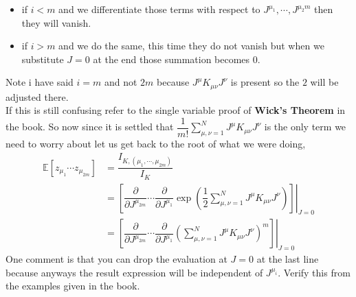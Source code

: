 \documentclass{scrartcl} %
\numberwithin{equation}{subsection}  %
\begin{document}
\begin{itemize}
	\item if $i < m$ and we differentiate those terms with respect to $J^{\mu_1},\cdots, J^{\mu_2m}$
		then they will vanish.
	\item if $i >m$ and we do the same, this time they do not vanish but when we substitute $J = 0$ at the end 
		those summation becomes $0$.
\end{itemize}
Note i have said $i = m$ and not $2m$ because $J^{\mu}K_{\mu \nu} J^{\nu}$ is present so the $2$ will be adjusted there.\\
If this is still confusing refer to the single variable proof of \textbf{Wick's Theorem} in the book. So now since
it is settled that $\dfrac{1}{m!}\sum\limits_{\mu, \nu = 1}^N J^{\mu} K_{\mu \nu} J^{\nu}$ is the only term we need
to worry about let us get back to the root of what we were doing,
\begin{align}
\mathbb{E}[z_{\mu_1}\cdots z_{\mu_{2m}}] &= \dfrac{I_{K,(\mu_1,\cdots,\mu_{2m})}}{I_K}\\
						 &= 
\left. \left[\dfrac{\partial}{\partial J^{\mu_{2m}}}\cdots\dfrac{\partial}{\partial J^{\mu_1}}\exp\left(\dfrac{1}{2}
		\sum\limits_{\mu,\nu = 1}^N J^{\mu}K_{\mu \nu} J^{\nu}\right)\right]\right|_{J=0}\\
		&=\left .\left[\dfrac{\partial}{\partial J^{\mu_{2m}}}\cdots\dfrac{\partial}{\partial J^{\mu_1}}
			\left(\sum\limits_{\mu,\nu = 1}^N J^{\mu}K_{\mu \nu}J^{\nu}\right)^m\right]\right|_{J=0}
\end{align}
One comment is that you can drop the evaluation at $J = 0$ at the last line because anyways the result expression will
be independent of $J^{\mu_i}$. Verify this from the examples given in the book.
\end{document}
